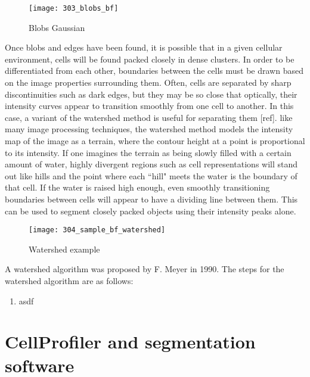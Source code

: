 \begin{figure}[p]
 \centering
 \texttt{[image: 303\_blobs\_bf]}
 \caption{
 	Blobs Gaussian
 }
 \label{fig:blob}
\end{figure}

Once blobs and edges have been found, it is possible that in a given cellular environment, cells will be found packed closely in dense clusters. In order to be differentiated from each other, boundaries between the cells must be drawn based on the image properties surrounding them. Often, cells are separated by sharp discontinuities such as dark edges, but they may be so close that optically, their intensity curves appear to transition smoothly from one cell to another. In this case, a variant of the watershed method is useful for separating them [ref]. like many image processing techniques, the watershed method models the intensity map of the image as a terrain, where the contour height at a point is proportional to its intensity. If one imagines the terrain as being slowly filled with a certain amount of water, highly divergent regions such as cell representations will stand out like hills and the point where each ``hill" meets the water is the boundary of that cell. If the water is raised high enough, even smoothly transitioning boundaries between cells will appear to have a dividing line between them. This can be used to segment closely packed objects using their intensity peaks alone.

\begin{figure}[p]
 \centering
 \texttt{[image: 304\_sample\_bf\_watershed]}
 \caption{
 	Watershed example
 }
 \label{fig:watershed}
\end{figure}

A watershed algorithm was proposed by F. Meyer in 1990. The steps for the watershed algorithm are as follows:
\begin{enumerate}
	\item asdf
\end{enumerate}

\section{CellProfiler and segmentation software}

